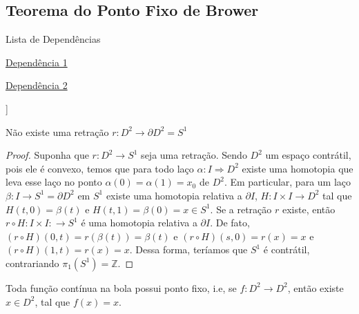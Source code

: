 \subsection{Teorema do Ponto Fixo de Brower}
\label{teo-ponto-fixo-Brower}

\begin{titlemize}{Lista de Dependências}
    \item \hyperref[retração-def]{Dependência 1}
    \item \hyperref[grupo-fundamental]{Dependência 2}
\end{titlemize}]

\begin{lemma}
    Não existe uma retração $r:D^2 \longrightarrow \partial D^2 = S^1$
\end{lemma}

\begin{proof}
 Suponha que $r:D^2 \longrightarrow S^1$ seja uma retração. Sendo $D^2$ um espaço contrátil, pois ele é convexo, temos que para todo laço $\alpha: I \Longrightarrow D^2$ existe uma homotopia que leva esse laço no ponto $\alpha(0) = \alpha(1) = x_0$ de $D^2$. Em particular, para um laço $\beta: I \longrightarrow S^1 = \partial D^2$ em $S^1$ existe uma homotopia relativa a $\partial I$, $H: I\times I \longrightarrow D^2$ tal que $H(t, 0) = \beta(t)$ e $H(t, 1) = \beta(0) = x \in S^1$. Se a retração $r$ existe, então $r\circ H: I\times I: \longrightarrow S^1$ é uma homotopia relativa a $\partial I$. De fato, $(r\circ H)(0, t) = r(\beta(t)) = \beta(t)$ e $(r\circ H)(s, 0) = r(x) = x$ e $(r\circ H)(1, t) = r(x) = x$. Dessa forma, teríamos que $S^1$ é contrátil, contrariando $\pi_1(S^1) = \mathbb{Z}$.
\end{proof}

\begin{thm}
Toda função contínua na bola possui ponto fixo, i.e, se $f:D^2 \longrightarrow D^2$, então existe $x \in D^2$, tal que $f(x) = x$.
\end{thm} 

